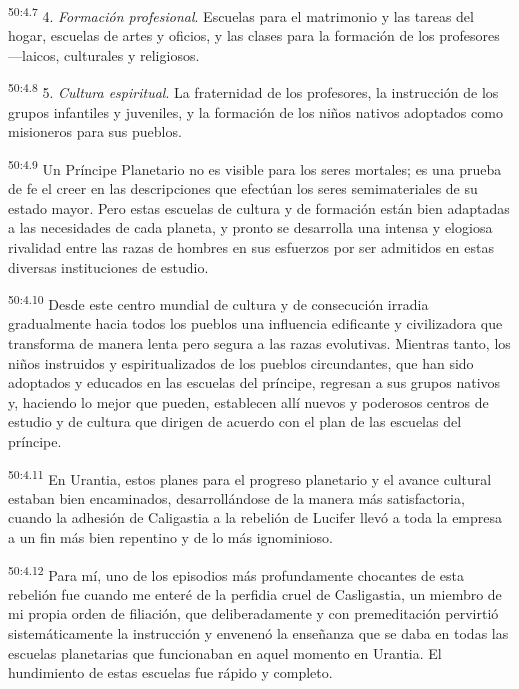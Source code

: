 \par
\textsuperscript{50:4.7} 4. \textit{Formación profesional}. Escuelas para el matrimonio y las tareas del hogar, escuelas de artes y oficios, y las clases para la formación de los profesores ---laicos, culturales y religiosos.

\par
\textsuperscript{50:4.8} 5. \textit{Cultura espiritual}. La fraternidad de los profesores, la instrucción de los grupos infantiles y juveniles, y la formación de los niños nativos adoptados como misioneros para sus pueblos.

\par
\textsuperscript{50:4.9} Un Príncipe Planetario no es visible para los seres mortales; es una prueba de fe el creer en las descripciones que efectúan los seres semimateriales de su estado mayor. Pero estas escuelas de cultura y de formación están bien adaptadas a las necesidades de cada planeta, y pronto se desarrolla una intensa y elogiosa rivalidad entre las razas de hombres en sus esfuerzos por ser admitidos en estas diversas instituciones de estudio.

\par
\textsuperscript{50:4.10} Desde este centro mundial de cultura y de consecución irradia gradualmente hacia todos los pueblos una influencia edificante y civilizadora que transforma de manera lenta pero segura a las razas evolutivas. Mientras tanto, los niños instruidos y espiritualizados de los pueblos circundantes, que han sido adoptados y educados en las escuelas del príncipe, regresan a sus grupos nativos y, haciendo lo mejor que pueden, establecen allí nuevos y poderosos centros de estudio y de cultura que dirigen de acuerdo con el plan de las escuelas del príncipe.

\par
\textsuperscript{50:4.11} En Urantia, estos planes para el progreso planetario y el avance cultural estaban bien encaminados, desarrollándose de la manera más satisfactoria, cuando la adhesión de Caligastia a la rebelión de Lucifer llevó a toda la empresa a un fin más bien repentino y de lo más ignominioso.

\par
\textsuperscript{50:4.12} Para mí, uno de los episodios más profundamente chocantes de esta rebelión fue cuando me enteré de la perfidia cruel de Casligastia, un miembro de mi propia orden de filiación, que deliberadamente y con premeditación pervirtió sistemáticamente la instrucción y envenenó la enseñanza que se daba en todas las escuelas planetarias que funcionaban en aquel momento en Urantia. El hundimiento de estas escuelas fue rápido y completo.

